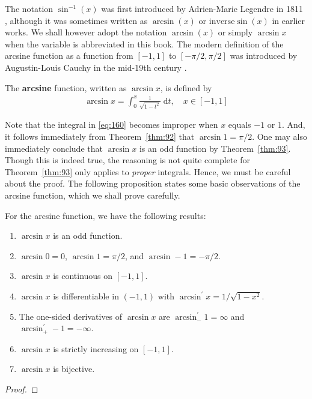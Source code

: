 \documentclass[thmcnt=section, 12pt]{my-elegantbook}
\begin{document}
The notation $\sin^{-1}(x)$ was first introduced by
Adrien-Marie Legendre in 1811 \cite{smithHistoryMathematics1958},
although it was sometimes written as $\arcsin(x)$
or $\mathrm{inverse} \sin(x)$ in earlier works.
We shall however adopt the notation $\arcsin(x)$
or simply $\arcsin x$ when the variable is abbreviated
in this book.
The modern definition of the arcsine function as a function
from $[-1, 1]$ to $[-\pi/2, \pi/2]$
was introduced by Augustin-Louis Cauchy
in the mid-19th century \cite{boyerHistoryCalculusIts1988}.


\begin{definition} \label{def:11}
    The \textbf{arcsine} function,
    written as $\arcsin x$,
    is defined by
    \begin{align}
        \arcsin x
        = \int_0^x \frac{1}{\sqrt{1-t^2}} \; \mathrm{d} t,
        \quad
        x \in [-1, 1]
        \label{eq:160}
    \end{align}
\end{definition}

Note that the integral in \eqref{eq:160} becomes improper
when $x$ equals $-1$ or $1$.
And, it follows immediately from Theorem~\ref{thm:92}
that $\arcsin 1 = \pi / 2$.
One may also immediately conclude that $\arcsin x$ is an odd function
by Theorem~\ref{thm:93}.
Though this is indeed true,
the reasoning is not quite complete for Theorem~\ref{thm:93}
only applies to \textit{proper} integrals.
Hence, we must be careful about the proof.
The following proposition states some basic observations
of the arcsine function,
which we shall prove carefully.

\begin{proposition} \label{pro:7}
    For the arcsine function, we have
    the following results:
    \begin{enumerate}
        \item $\arcsin x$ is an odd function.
        \item $\arcsin 0 = 0$, $\arcsin 1 = \pi / 2$,
              and $\arcsin -1 = -\pi / 2$.
        \item $\arcsin x$ is continuous on $[-1, 1]$.
        \item $\arcsin x$ is differentiable in $(-1, 1)$
              with $\arcsin^\prime x = 1 / \sqrt{1 - x^2}$.
        \item The one-sided derivatives of $\arcsin x$
              are $\arcsin^\prime_{-} 1 = \infty$
              and $\arcsin^\prime_{+} -1 = -\infty$.
        \item $\arcsin x$ is strictly increasing on $[-1, 1]$.
        \item $\arcsin x$ is bijective.
    \end{enumerate}
\end{proposition}

\begin{proof}
\end{proof}





\printbibliography[heading=bibintoc, title=References]


\printindex

\end{document}

